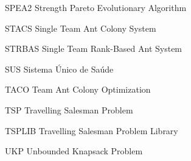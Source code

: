 \begin{siglas}
  \item[SPEA2] Strength Pareto Evolutionary Algorithm 
  \item[STACS] Single Team Ant Colony System
  \item[STRBAS] Single Team Rank-Based Ant System 
  \item[SUS] Sistema Único de Saúde 
  \item[TACO] Team Ant Colony Optimization
  \item[TSP] Travelling Salesman Problem
  \item[TSPLIB] Travelling Salesman Problem Library
  \item[UKP] Unbounded Knapsack Problem
                        
\end{siglas}

